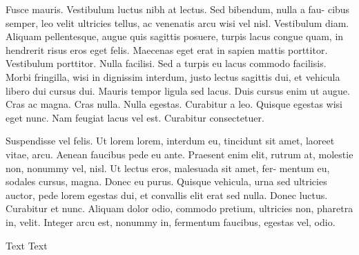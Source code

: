 \documentclass{report}
\begin{document}
Fusce mauris. Vestibulum luctus nibh at lectus. Sed bibendum, nulla a fau-
cibus semper, leo velit ultricies tellus, ac venenatis arcu wisi vel nisl. Vestibulum
diam. Aliquam pellentesque, augue quis sagittis posuere, turpis lacus congue
quam, in hendrerit risus eros eget felis. Maecenas eget erat in sapien mattis
porttitor. Vestibulum porttitor. Nulla facilisi. Sed a turpis eu lacus commodo
facilisis. Morbi fringilla, wisi in dignissim interdum, justo lectus sagittis dui, et
vehicula libero dui cursus dui. Mauris tempor ligula sed lacus. Duis cursus enim
ut augue. Cras ac magna. Cras nulla. Nulla egestas. Curabitur a leo. Quisque
egestas wisi eget nunc. Nam feugiat lacus vel est. Curabitur consectetuer.

Suspendisse vel felis. Ut lorem lorem, interdum eu, tincidunt sit amet,
laoreet vitae, arcu. Aenean faucibus pede eu ante. Praesent enim elit, rutrum
at, molestie non, nonummy vel, nisl. Ut lectus eros, malesuada sit amet, fer-
mentum eu, sodales cursus, magna. Donec eu purus. Quisque vehicula, urna sed
ultricies auctor, pede lorem egestas dui, et convallis elit erat sed nulla. Donec
luctus. Curabitur et nunc. Aliquam dolor odio, commodo pretium, ultricies
non, pharetra in, velit. Integer arcu est, nonummy in, fermentum faucibus,
egestas vel, odio.

Text Text
\end{document}
